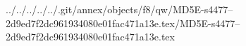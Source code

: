 ../../../../../.git/annex/objects/f8/qw/MD5E-s4477--2d9ed7f2dc961934080e01fac471a13e.tex/MD5E-s4477--2d9ed7f2dc961934080e01fac471a13e.tex